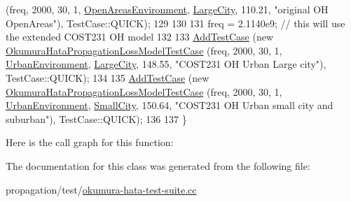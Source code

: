 \begin{DoxyCode}
       (freq, 2000, 30, 1, \hyperlink{group__propagation_gga0e392ed771a28c92112047e63308a53aa51f78effebc3753d7cd2ee9b5924c028}{OpenAreasEnvironment}, \hyperlink{group__propagation_gga29c9a1b1a58b6a56054ff5ea4c5a574da017d6be2af0a102a6147e6519d63f54c}{LargeCity}, 110.21, \textcolor{stringliteral}{"original OH
       OpenAreas"}), TestCase::QUICK);
129 
130 
131   freq = 2.1140e9;  \textcolor{comment}{// this will use the extended COST231 OH model}
132 
133   \hyperlink{classns3_1_1TestCase_a3718088e3eefd5d6454569d2e0ddd835}{AddTestCase} (\textcolor{keyword}{new} \hyperlink{classOkumuraHataPropagationLossModelTestCase}{OkumuraHataPropagationLossModelTestCase}
       (freq, 2000, 30, 1, \hyperlink{group__propagation_gga0e392ed771a28c92112047e63308a53aad575d1b07ccac0218783bbd0f523784c}{UrbanEnvironment}, \hyperlink{group__propagation_gga29c9a1b1a58b6a56054ff5ea4c5a574da017d6be2af0a102a6147e6519d63f54c}{LargeCity}, 148.55, \textcolor{stringliteral}{"COST231 OH Urban Large
       city"}), TestCase::QUICK);
134 
135   \hyperlink{classns3_1_1TestCase_a3718088e3eefd5d6454569d2e0ddd835}{AddTestCase} (\textcolor{keyword}{new} \hyperlink{classOkumuraHataPropagationLossModelTestCase}{OkumuraHataPropagationLossModelTestCase}
       (freq, 2000, 30, 1, \hyperlink{group__propagation_gga0e392ed771a28c92112047e63308a53aad575d1b07ccac0218783bbd0f523784c}{UrbanEnvironment}, \hyperlink{group__propagation_gga29c9a1b1a58b6a56054ff5ea4c5a574dad3f856f2f166ae12798befabfbd2c99e}{SmallCity}, 150.64, \textcolor{stringliteral}{"COST231 OH Urban small
       city and suburban"}), TestCase::QUICK);
136 
137 \}
\end{DoxyCode}


Here is the call graph for this function\+:




The documentation for this class was generated from the following file\+:\begin{DoxyCompactItemize}
\item 
propagation/test/\hyperlink{okumura-hata-test-suite_8cc}{okumura-\/hata-\/test-\/suite.\+cc}\end{DoxyCompactItemize}
